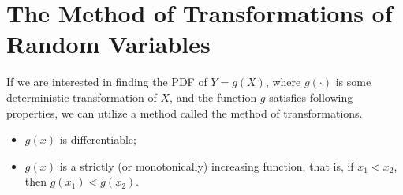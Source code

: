 \section{The Method of Transformations of Random Variables}

If we are interested in finding the PDF of $Y=g(X)$, where $g(\cdot)$ is some deterministic transformation of $X$, and the function $g$ satisfies following properties, we can utilize a method called the method of transformations.
\begin{itemize}
	\item $g(x)$ is differentiable;
	\item $g(x)$ is a strictly (or monotonically) increasing function, that is, if $x_1<x_2$, then $g(x_1)<g(x_2)$.
\end{itemize}


